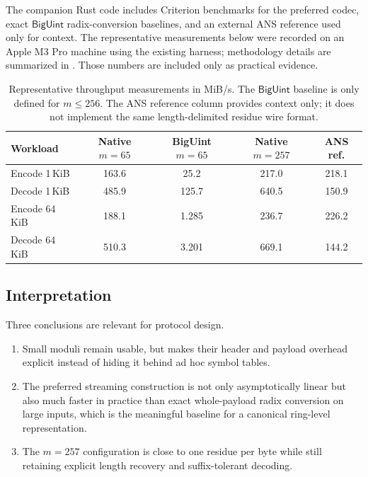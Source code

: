 \documentclass{system-security-article}
\begin{document}
    The companion Rust code includes Criterion benchmarks for the preferred codec,
    exact $\mathsf{BigUint}$ radix-conversion baselines, and an external ANS reference used only for context.
    The representative measurements below were recorded on an Apple M3 Pro machine using the existing harness;
    methodology details are summarized in .
    Those numbers are included only as practical evidence.

    \begin{table}[t]
        \centering
        \caption{Representative throughput measurements in MiB/s. The $\mathsf{BigUint}$
        baseline is only defined for \(m \le 256\). The ANS reference column provides context only;
        it does not implement the same length-delimited residue wire format.}
        \label{tab:benchmarks}
        \begin{tabular}{@{}lcccc@{}}
            \toprule
            Workload       & Native \(m=65\) & BigUint \(m=65\) & Native \(m=257\) & ANS ref. \\
            \midrule
            Encode 1\,KiB  & 163.6           & 25.2             & 217.0            & 218.1    \\
            Decode 1\,KiB  & 485.9           & 125.7            & 640.5            & 150.9    \\
            Encode 64\,KiB & 188.1           & 1.285            & 236.7            & 226.2    \\
            Decode 64\,KiB & 510.3           & 3.201            & 669.1            & 144.2    \\
            \bottomrule
        \end{tabular}
    \end{table}

    \subsection{Interpretation}
    \label{subsec:interpretation}

    Three conclusions are relevant for protocol design.
    \begin{enumerate}
        \item Small moduli remain usable, but  makes their header and payload overhead
        explicit instead of hiding it behind ad hoc symbol tables.
        \item The preferred streaming construction is not only asymptotically linear but also much faster in
        practice than exact whole-payload radix conversion on large inputs, which is the meaningful baseline
        for a canonical ring-level representation.
        \item The \(m=257\) configuration is close to one residue per byte while still retaining explicit
        length recovery and suffix-tolerant decoding.
    \end{enumerate}
\end{document}
